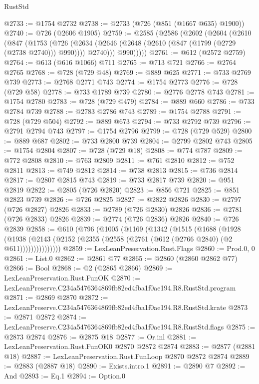 \begin{lexlean}{RustStd}
\begin{coremodule}
@2733 := @1754 @2732
@2738 := @2733 (@726 (@851 (@1667 @635) @1900))
@2740 := @726 (@2606 @1905)
@2759 := @2585
    (@2586
      (@2602
        (@2604
          (@2610
            (@847
              (@1753
                (@726
                  (@2634 (@2646 (@2648 (@2610 (@847 (@1799 (@2729 (@2738 @2740))) @990)))) @2740)))
              @990)))))
@2761 := @612 (@2572 @2759)
@2764 := @613 (@616 @1066) @711
@2765 := @713 @721
@2766 := @2764 @2765
@2768 := @728 (@729 @48)
@2769 := @889 @625
@2771 := @733 @2769 @739
@2773 := @2768 @2771 @743
@2774 := @1754 @2773
@2776 := @728 (@729 @58)
@2778 := @733 @1789 @739
@2780 := @2776 @2778 @743
@2781 := @1754 @2780
@2783 := @728 (@729 @479)
@2784 := @889 @660
@2786 := @733 @2784 @739
@2788 := @2783 @2786 @743
@2789 := @1754 @2788
@2791 := @728 (@729 @504)
@2792 := @889 @673
@2794 := @733 @2792 @739
@2796 := @2791 @2794 @743
@2797 := @1754 @2796
@2799 := @728 (@729 @529)
@2800 := @889 @687
@2802 := @733 @2800 @739
@2804 := @2799 @2802 @743
@2805 := @1754 @2804
@2807 := @728 (@729 @18)
@2808 := @774 @787
@2809 := @772 @2808
@2810 := @763 @2809
@2811 := @761 @2810
@2812 := @752 @2811
@2813 := @749 @2812
@2814 := @738 @2813
@2815 := @736 @2814
@2817 := @2807 @2815 @743
@2819 := @733 @2817 @739
@2820 := @951 @2819
@2822 := @2805 (@726 @2820)
@2823 := @856 @721
@2825 := @851 @2823 @739
@2826 := @726 @2825
@2827 := @2822 @2826
@2830 := @2797 (@726 @2827) @2826
@2833 := @2789 (@726 @2830) @2826
@2836 := @2781 (@726 @2833) @2826
@2839 := @2774 (@726 @2836) @2826
@2840 := @726 @2839
@2858 := @610
    (@796
      (@1005
        (@1169
          (@1342
            (@1515
              (@1688
                (@1928
                  (@1938
                    (@2143 (@2152 (@2355 (@2558 (@2761 (@612 (@2766 @2840) (@2 @611)))))))))))))))
@2859 := LexLeanPreservation.Rust.Flags
@2860 := Prod.{0, 0}
@2861 := List.{0}
@2862 := @2861 @77
@2865 := @2860 (@2860 @2862 @77)
@2866 := Bool
@2868 := @2 (@2865 @2866)
@2869 := LexLeanPreservation.Rust.FunOK
@2870 := LexLeanPreserve.C234a5476364869fb82ed4fba1f0ae194.R8.RustStd.program
@2871 := @2869 @2870
@2872 := LexLeanPreserve.C234a5476364869fb82ed4fba1f0ae194.R8.RustStd.krate
@2873 := @2871 @2872
@2874 := LexLeanPreserve.C234a5476364869fb82ed4fba1f0ae194.R8.RustStd.flags
@2875 := @2873 @2874
@2876 := @2875 @18
@2877 := Or.inl
@2881 := LexLeanPreservation.Rust.FunOK0 @2870 @2872 @2874
@2883 := @2877 (@2881 @18)
@2887 := LexLeanPreservation.Rust.FunLoop @2870 @2872 @2874
@2889 := @2883 (@2887 @18)
@2890 := Exists.intro.{1}
@2891 := @2890 @7
@2892 := And
@2893 := Eq.{1}
@2894 := Option.{0}

\end{coremodule}
\end{lexlean}
